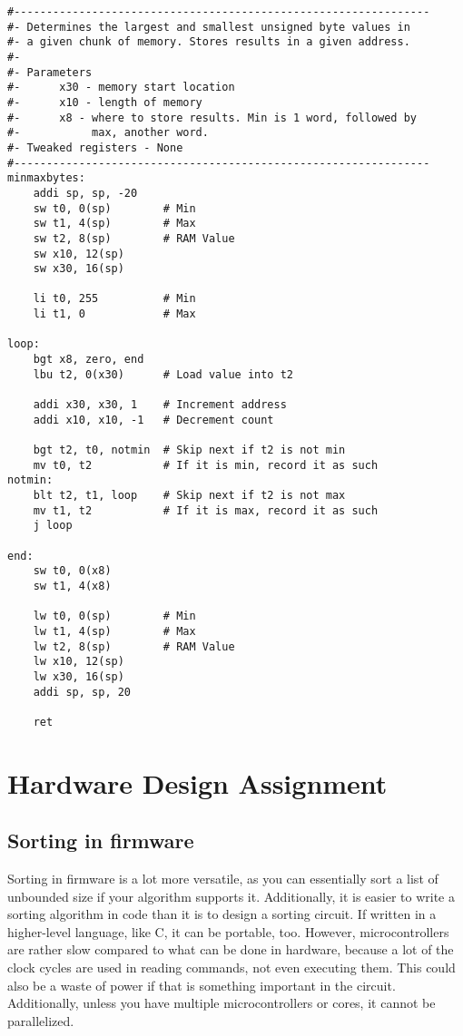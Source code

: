\documentclass{article}
\begin{document}
\begin{verbatim}
#---------------------------------------------------------------- 
#- Determines the largest and smallest unsigned byte values in 
#- a given chunk of memory. Stores results in a given address.
#-
#- Parameters
#-      x30 - memory start location
#-      x10 - length of memory
#-      x8 - where to store results. Min is 1 word, followed by 
#-           max, another word.
#- Tweaked registers - None
#---------------------------------------------------------------- 
minmaxbytes:
    addi sp, sp, -20
    sw t0, 0(sp)        # Min
    sw t1, 4(sp)        # Max
    sw t2, 8(sp)        # RAM Value
    sw x10, 12(sp)
    sw x30, 16(sp)

    li t0, 255          # Min
    li t1, 0            # Max

loop:
    bgt x8, zero, end
    lbu t2, 0(x30)      # Load value into t2

    addi x30, x30, 1    # Increment address
    addi x10, x10, -1   # Decrement count

    bgt t2, t0, notmin  # Skip next if t2 is not min
    mv t0, t2           # If it is min, record it as such
notmin:
    blt t2, t1, loop    # Skip next if t2 is not max
    mv t1, t2           # If it is max, record it as such
    j loop

end:
    sw t0, 0(x8)
    sw t1, 4(x8)

    lw t0, 0(sp)        # Min
    lw t1, 4(sp)        # Max
    lw t2, 8(sp)        # RAM Value
    lw x10, 12(sp)
    lw x30, 16(sp)
    addi sp, sp, 20

    ret
\end{verbatim}

\pagebreak

\section{Hardware Design Assignment}

\subsection{Sorting in firmware}

Sorting in firmware is a lot more versatile, as you can essentially sort a list of unbounded size if your 
algorithm supports it. Additionally, it is easier to write a sorting algorithm in code than it is to 
design a sorting circuit. If written in a higher-level language, like C, it can be portable, too. However, 
microcontrollers are rather slow compared to what can be done in hardware, because a lot of the clock 
cycles are used in reading commands, not even executing them. This could also be a waste of power if that 
is something important in the circuit. Additionally, unless you have multiple microcontrollers or cores, 
it cannot be parallelized. 
\end{document}
